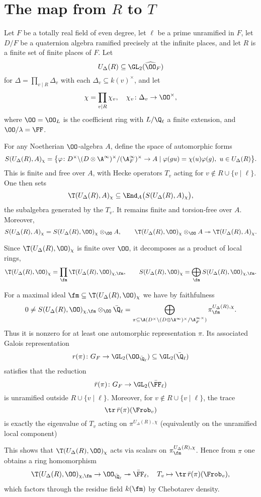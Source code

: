 \section*{The map from $R$ to $T$}

Let $F$ be a totally real field of even degree, let $\ell$ be a prime unramified in $F$,
let $D/F$ be a quaternion algebra ramified precisely at the infinite places,
and let $R$ is a finite set of finite places of $F$. Let
\[
U_\Delta(R) \subseteq \GL_2(\widehat\OO_F)
\]
for $\Delta = \prod_{v\mid R}\Delta_v$ with each $\Delta_v \subseteq k(v)^\times$, and let
\[
\chi = \prod_{v\mid R} \chi_v, \quad \chi_v\colon \Delta_v\to \OO^\times,
\]
where $\OO =\OO_L$ is the coefficient ring with $L/\Q_\ell$ a finite extension, and $\OO/\lambda = \FF$.

For any Noetherian $\OO$‑algebra $A$, define the space of automorphic forms
\[
S(U_\Delta(R),A)_\chi = \bigl\{ \varphi\colon D^\times\backslash(D\otimes\A^\infty)^\times/(\A_F^\infty)^\times\to A \mid \varphi(gu)=\chi(u)\varphi(g),\ u\in U_\Delta(R)\bigr\}.
\]
This is finite and free over $A$, with Hecke operators $T_v$ acting for $v\notin R\cup\{v\mid\ell\}$. One then sets
\[
\T(U_\Delta(R),A)_\chi \subseteq \End_A\bigl(S(U_\Delta(R),A)_\chi\bigr),
\]
the subalgebra generated by the $T_v$. It remains finite and torsion‑free over $A$. Moreover,
\[
S(U_\Delta(R),A)_\chi = S(U_\Delta(R),\OO)_\chi\otimes_\OO A,\qquad
\T(U_\Delta(R),\OO)_\chi\otimes_\OO A \twoheadrightarrow \T(U_\Delta(R),A)_\chi.
\]

Since $\T(U_\Delta(R),\OO)_\chi$ is finite over $\OO$, it decomposes as a product of local rings,
\[
\T(U_\Delta(R),\OO)_\chi = \prod_\fm \T(U_\Delta(R),\OO)_{\chi,\fm},\qquad
S(U_\Delta(R),\OO)_\chi = \bigoplus_\fm S(U_\Delta(R),\OO)_{\chi,\fm}.
\]

For a maximal ideal $\fm\subseteq \T(U_\Delta(R),\OO)_\chi$ we have by faithfulness
\[
0\neq S(U_\Delta(R),\OO)_{\chi,\fm}\otimes_\OO\bar\Q_\ell
= \bigoplus_{\pi\subseteq\A(D^\times\backslash(D\otimes\A^\infty)^\times/\A_F^{\infty\times})}
\pi_{\fm}^{U_\Delta(R),\chi}.
\]
Thus it is nonzero for at least one automorphic representation $\pi$.  Its associated Galois representation
\[
r(\pi)\colon G_F\to\GL_2(\OO_{\bar\Q_\ell})\subseteq\GL_2(\bar\Q_\ell)
\]
satisfies that the reduction
\[
\bar r(\pi)\colon G_F\to\GL_2(\bar\FF_\ell)
\]
is unramified outside $R\cup\{v\mid\ell\}$.  Moreover, for $v\notin R\cup\{v\mid\ell\}$, the trace
\[
\tr\,\bar r(\pi)(\Frob_v)
\]
is exactly the eigenvalue of $T_v$ acting on $\pi^{U_\Delta(R),\chi}$ (equivalently on the unramified local component)

This shows that $\T(U_\Delta(R),\OO)_\chi$ acts via scalars on $\pi_{\fm}^{U_\Delta(R),\chi}$.  Hence from $\pi$ one obtains a ring homomorphism
\[
\T(U_\Delta(R),\OO)_{\chi,\fm}\to \OO_{\bar\Q_\ell}\twoheadrightarrow\bar\FF_\ell,
\quad T_v \mapsto \tr\,\bar r(\pi)(\Frob_v),
\]
which factors through the residue field $k(\fm)$ by Chebotarev density.
